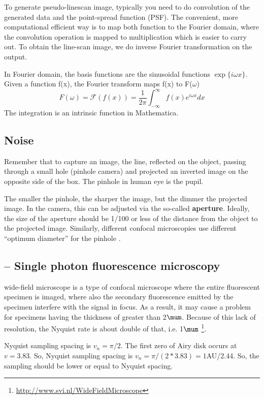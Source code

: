 To generate pseudo-linescan image, typically you need to do convolution of the
generated data and the point-spread function (PSF). The convenient, more
computational efficient way is to map both function to the Fourier domain, where
the convolution operation is mapped to multiplication which is easier to carry
out. To obtain the line-scan image, we do inverse Fourier transformation on the
output. 

In Fourier domain, the basis functions are the sinusoidal functions
$\exp\{i\omega x\}$. Given a function f(x), the Fourier transform maps f(x) to
F($\omega$)
\begin{equation}
F(\omega) = \mathcal{F}(f(x)) = \frac{1}{2\pi}\int^\infty_{-\infty}
f(x)e^{i\omega x} dx
\end{equation}
The integration is an intrinsic function in Mathematica.

\subsection{Noise}
\label{sec:noise_confocalmicroscopy}

Remember that to capture an image, the line, reflected on the object, passing
through a small hole (pinhole camera) and projected an inverted image on the opposite side of the
box. The pinhole in human eye is the pupil. 

The smaller the pinhole, the sharper the image, but the dimmer the projected
image. In the camera, this can be adjusted via the so-called {\bf aperture}.
Ideally, the size of the aperture should be 1/100 or less of the distance from
the object to the projected image. Similarly, different confocal microscopies
use different ``optimum diameter'' for the pinhole \citep{sheppard1992}.

\subsection{-- Single photon fluorescence microscopy}

\begin{framed}
wide-field microscope is a type of confocal microscope where the entire
fluorescent specimen is imaged, where also the secondary fluorescence emitted by
the specimen interfere with the signal in focus. As a result, it may cause a
problem for specimens having the thickness of greater than 2$\mum$. Because of
this lack of resolution, the Nyquist rate is about double of that, i.e.
1$\mum$ \footnote{\url{http://www.svi.nl/WideFieldMicroscope}}.

Nyquist sampling spacing is $v_n=\pi/2$. The first zero of Airy disk occurs at
$v=3.83$. So, Nyquist sampling spacing is $v_n=\pi/(2*3.83)=1$AU/2.44. So, the
sampling should be lower or equal to Nyquist spacing.  
\end{framed}

